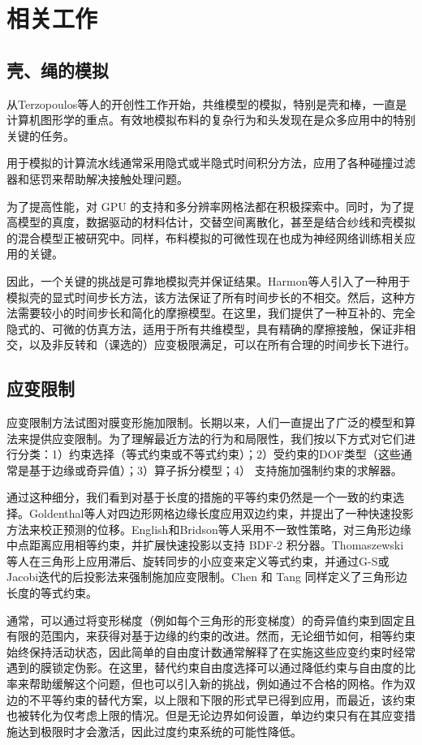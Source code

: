 \section{相关工作}

\subsection{壳、绳的模拟}

从Terzopoulos等人的开创性工作开始，共维模型的模拟，特别是壳和棒，一直是计算机图形学的重点。有效地模拟布料的复杂行为和头发现在是众多应用中的特别关键的任务。

用于模拟的计算流水线通常采用隐式或半隐式时间积分方法，应用了各种碰撞过滤器和惩罚来帮助解决接触处理问题。

为了提高性能，对 GPU 的支持和多分辨率网格法都在积极探索中。同时，为了提高模型的真度，数据驱动的材料估计，交替空间离散化，甚至是结合纱线和壳模拟的混合模型正被研究中。同样，布料模拟的可微性现在也成为神经网络训练相关应用的关键。

因此，一个关键的挑战是可靠地模拟壳并保证结果。Harmon等人引入了一种用于模拟壳的显式时间步长方法，该方法保证了所有时间步长的不相交。然后，这种方法需要较小的时间步长和简化的摩擦模型。在这里，我们提供了一种互补的、完全隐式的、可微的仿真方法，适用于所有共维模型，具有精确的摩擦接触，保证非相交，以及非反转和（课选的）应变极限满足，可以在所有合理的时间步长下进行。

\subsection{应变限制}

应变限制方法试图对膜变形施加限制。长期以来，人们一直提出了广泛的模型和算法来提供应变限制。为了理解最近方法的行为和局限性，我们按以下方式对它们进行分类：1）约束选择（等式约束或不等式约束）；2）受约束的DOF类型（这些通常是基于边缘或奇异值）；3）算子拆分模型；4） 支持施加强制约束的求解器。

通过这种细分，我们看到对基于长度的措施的平等约束仍然是一个一致的约束选择。Goldenthal等人对四边形网格边缘长度应用双边约束，并提出了一种快速投影方法来校正预测的位移。English和Bridson等人采用不一致性策略，对三角形边缘中点距离应用相等约束，并扩展快速投影以支持 BDF-2 积分器。Thomaszewski 等人在三角形上应用滞后、旋转同步的小应变来定义等式约束，并通过G-S或Jacobi迭代的后投影法来强制施加应变限制。Chen 和 Tang 同样定义了三角形边长度的等式约束。

通常，可以通过将变形梯度（例如每个三角形的形变梯度）的奇异值约束到固定且有限的范围内，来获得对基于边缘的约束的改进。然而，无论细节如何，相等约束始终保持活动状态，因此简单的自由度计数通常解释了在实施这些应变约束时经常遇到的膜锁定伪影。在这里，替代约束自由度选择可以通过降低约束与自由度的比率来帮助缓解这个问题，但也可以引入新的挑战，例如通过不合格的网格。作为双边的不平等约束的替代方案，以上限和下限的形式早已得到应用，而最近，该约束也被转化为仅考虑上限的情况。但是无论边界如何设置，单边约束只有在其应变措施达到极限时才会激活，因此过度约束系统的可能性降低。

